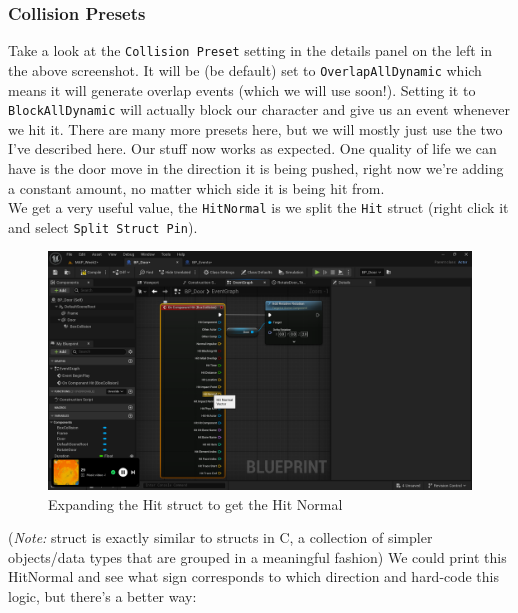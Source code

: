 \documentclass[]{article}
\begin{document}
	\subsubsection{Collision Presets}
	Take a look at the \verb|Collision Preset| setting in the details panel on the left in the above screenshot. It will be (be default) set to \verb*|OverlapAllDynamic| which means it will generate overlap events (which we will use soon!). Setting it to \verb*|BlockAllDynamic| will actually block our character and give us an event whenever we hit it. There are many more presets here, but we will mostly just use the two I've described here.
	\newpage
	Our stuff now works as expected. One quality of life we can have is the door move in the direction it is being pushed, right now we're adding a constant amount, no matter which side it is being hit from. \\[10pt] We get a very useful value, the \verb*|HitNormal| is we split the \verb*|Hit| struct (right click it and select \verb|Split Struct Pin|).
	
	\begin{figure}[h]
		\centering
		\includegraphics[width=1\linewidth]{day4images/screenshot010}
		\caption{Expanding the Hit struct to get the Hit Normal}
		\label{fig:screenshot010}
	\end{figure}
	
	(\textit{Note:} struct is exactly similar to structs in C, a collection of simpler objects/data types that are grouped in a meaningful fashion)
		\newpage
	We could print this HitNormal and see what sign corresponds to which direction and hard-code this logic, but there's a better way:
\end{document}
